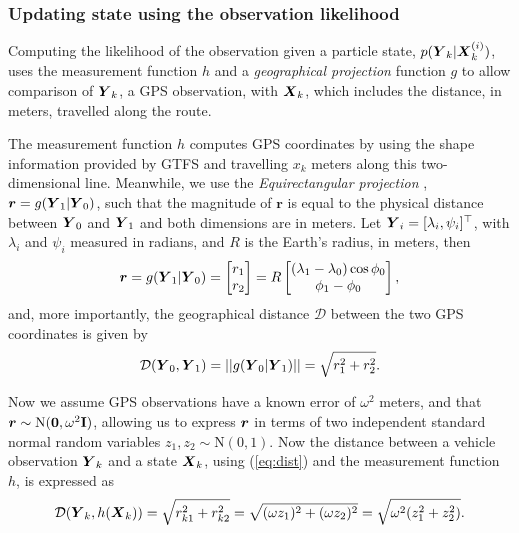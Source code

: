 \subsubsection{Updating state using the observation likelihood}
\label{sec:pf_update}

Computing the likelihood of the observation given a particle state,
$p(\mbox{$\boldsymbol{Y}$}_k|\mbox{$\boldsymbol{X}$}_k^{(i)})$,
uses the measurement function $h$ and
a \emph{geographical projection} function $g$ to allow comparison of $\mbox{$\boldsymbol{Y}$}_k$,
a GPS observation, with $\mbox{$\boldsymbol{X}$}_k$,
which includes the distance, in meters, travelled along the route.

The measurement function $h$ computes GPS coordinates by using the
shape information provided by GTFS and travelling $x_k$ meters along
this two-dimensional line.
Meanwhile, we use the \emph{Equirectangular projection} \citep{Snyder_1998},
$\boldsymbol{r} = g(\mbox{$\boldsymbol{Y}$}_1 | \mbox{$\boldsymbol{Y}$}_0)$,
such that the magnitude of $\boldsymbol{r}$ is equal to the physical distance
between $\mbox{$\boldsymbol{Y}$}_0$ and $\mbox{$\boldsymbol{Y}$}_1$ and both dimensions are in meters.
Let $\mbox{$\boldsymbol{Y}$}_i = [\lambda_i, \psi_i]^\top$,
with $\lambda_i$ and $\psi_i$ measured in radians,
and $R$ is the Earth's radius, in meters, then
\begin{equation*}
\boldsymbol{r} =
g(\mbox{$\boldsymbol{Y}$}_1 | \mbox{$\boldsymbol{Y}$}_0) =
    \begin{bmatrix}
        r_1 \\ r_2
    \end{bmatrix} =
    R \begin{bmatrix}
        (\lambda_1 - \lambda_0)\cos\phi_0 \\
        \phi_1 - \phi_0
    \end{bmatrix},
\end{equation*}
and, more importantly, the geographical distance $\mathcal{D}$ between the two
GPS coordinates is given by
\begin{equation}
\label{eq:dist}
\mathcal{D}(\mbox{$\boldsymbol{Y}$}_0, \mbox{$\boldsymbol{Y}$}_1) = ||g(\mbox{$\boldsymbol{Y}$}_0 | \mbox{$\boldsymbol{Y}$}_1)|| = \sqrt{r_1^2 + r_2^2}.
\end{equation}


Now we assume GPS observations have a known error of $\omega^2$ meters,
and that \mbox{$\boldsymbol{r} \sim \mathrm{N}(\boldsymbol{0}, \omega^2\mathbf{I})$},
allowing us to express $\boldsymbol{r}$ in terms of two independent
standard normal random variables $z_1, z_2 \sim \mathrm{N}(0,1)$.
Now the distance between a vehicle observation $\mbox{$\boldsymbol{Y}$}_k$
and a state $\mbox{$\boldsymbol{X}$}_k$, using (\ref{eq:dist}) and the measurement function $h$,
is expressed as
\begin{equation}
\label{eq:obs_dist}
\mathcal{D}(\mbox{$\boldsymbol{Y}$}_k, h(\mbox{$\boldsymbol{X}$}_k)) = \sqrt{r_{k1}^2 + r_{k2}^2}
    = \sqrt{(\omega z_1)^2 + (\omega z_2)^2}
    = \sqrt{\omega^2 (z_1^2 + z_2^2)}.
\end{equation}

